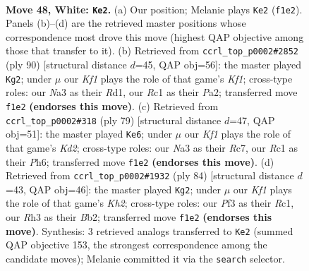 \documentclass[11pt]{article}
\begin{document}
\clearpage

\begin{figure}[p]\centering
\begin{subfigure}{0.46\textwidth}\centering
\resizebox{\linewidth}{!}{%
\newchessgame
\chessboard[
  setfen={r7/pn6/1pr1p1kp/5p2/2P5/N1B1PP1R/P5P1/2R2K2 w - - 3 48},
  showmover=false,
  pgfstyle=straightmove, color=movearrow, markmove={f1-e2}
]}
\caption{}
\end{subfigure}\hfill
\begin{subfigure}{0.46\textwidth}\centering
\resizebox{\linewidth}{!}{%
\newchessgame
\chessboard[
  setfen={5b2/p2r1k2/6p1/2pPpp1p/N6P/1P3P2/P4P2/3R1K2 w - - 5 46},
  showmover=false,
  pgfstyle=straightmove, color=movearrow, markmove={f1-g2}
]}
\caption{}
\end{subfigure}
\\[4pt]
\begin{subfigure}{0.46\textwidth}\centering
\resizebox{\linewidth}{!}{%
\newchessgame
\chessboard[
  setfen={1r6/2rk4/7p/3pP1p1/P1pBn3/7P/1PR3PK/5R2 b - - 1 40},
  showmover=false,
  pgfstyle=straightmove, color=movearrow, markmove={d7-e6}
]}
\caption{}
\end{subfigure}\hfill
\begin{subfigure}{0.46\textwidth}\centering
\resizebox{\linewidth}{!}{%
\newchessgame
\chessboard[
  setfen={6k1/3r2p1/pp2r2p/1n2p3/4P3/P2P2PP/1B1R3K/2R5 w - - 0 43},
  showmover=false,
  pgfstyle=straightmove, color=movearrow, markmove={h2-g2}
]}
\caption{}
\end{subfigure}
\caption{\textbf{Move 48, White: \texttt{Ke2}.} (a) Our position; Melanie plays \texttt{Ke2} (\texttt{f1e2}). Panels (b)--(d) are the retrieved master positions whose correspondence most drove this move (highest QAP objective among those that transfer to it). (b) Retrieved from \texttt{ccrl\_top\_p0002\#2852} (ply 90) [structural distance $d$=45, QAP obj=56]: the master played \texttt{Kg2}; under $\mu$ our \emph{Kf1} plays the role of that game's \emph{Kf1}; cross-type roles: our \emph{N}a3 as their \emph{R}d1, our \emph{R}c1 as their \emph{P}a2; transferred move \texttt{f1e2} \textbf{(endorses this move)}. (c) Retrieved from \texttt{ccrl\_top\_p0002\#318} (ply 79) [structural distance $d$=47, QAP obj=51]: the master played \texttt{Ke6}; under $\mu$ our \emph{Kf1} plays the role of that game's \emph{Kd2}; cross-type roles: our \emph{N}a3 as their \emph{R}c7, our \emph{R}c1 as their \emph{P}h6; transferred move \texttt{f1e2} \textbf{(endorses this move)}. (d) Retrieved from \texttt{ccrl\_top\_p0002\#1932} (ply 84) [structural distance $d$=43, QAP obj=46]: the master played \texttt{Kg2}; under $\mu$ our \emph{Kf1} plays the role of that game's \emph{Kh2}; cross-type roles: our \emph{P}f3 as their \emph{R}c1, our \emph{R}h3 as their \emph{B}b2; transferred move \texttt{f1e2} \textbf{(endorses this move)}. Synthesis: 3 retrieved analogs transferred to \texttt{Ke2} (summed QAP objective 153, the strongest correspondence among the candidate moves); Melanie committed it via the \texttt{search} selector.}
\label{fig:thought-m94}
\end{figure}
\end{document}
